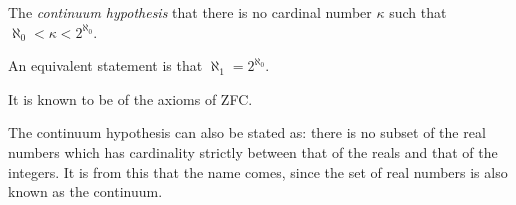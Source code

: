 \documentclass[12pt]{article}
\begin{document}
The \emph{continuum hypothesis}  that there is no cardinal number $\kappa$ such that $\aleph_0<\kappa <2^{\aleph_0}$.

An equivalent statement is that $\aleph_1 =2^{\aleph_0}$.

It is known to be  of the axioms of ZFC.

The continuum hypothesis can also be stated as:  there is no subset of the real numbers which has cardinality strictly between that of the reals and that of the integers.  It is from this that the name comes, since the set of real numbers is also known as the continuum.
\end{document}
